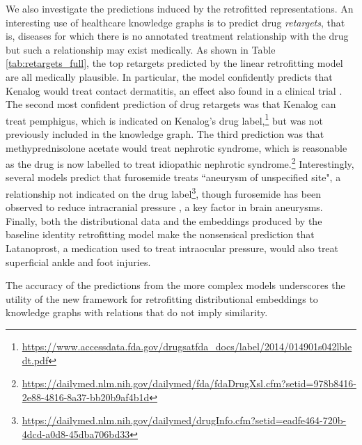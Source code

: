 \documentclass[11pt, a4paper]{article}
\begin{document}
We also investigate the predictions induced by the retrofitted representations. An interesting use of healthcare knowledge graphs is to predict drug \textit{retargets}, that is, diseases for which there is no annotated treatment relationship with the drug but such a relationship may exist medically. As shown in Table \ref{tab:retargets_full}, the top retargets predicted by the linear retrofitting model are all medically plausible. In particular, the model confidently predicts that Kenalog would treat contact dermatitis, an effect also found in a clinical trial \cite{usatine2010diagnosis}.%
The second most confident prediction of drug retargets was that Kenalog can treat pemphigus, which is indicated on Kenalog's drug label,\footnote{\url{https://www.accessdata.fda.gov/drugsatfda_docs/label/2014/014901s042lbledt.pdf}} 
but was not previously included in the knowledge graph.
The third prediction was that methyprednisolone acetate would treat nephrotic syndrome, which is reasonable as the drug is now labelled to treat idiopathic nephrotic syndrome.\footnote{\url{https://dailymed.nlm.nih.gov/dailymed/fda/fdaDrugXsl.cfm?setid=978b8416-2e88-4816-8a37-bb20b9af4b1d}}
Interestingly, several models predict that furosemide treats ``aneurysm of unspecified site", a relationship not indicated on the drug label\footnote{\url{https://dailymed.nlm.nih.gov/dailymed/drugInfo.cfm?setid=eadfe464-720b-4dcd-a0d8-45dba706bd33}}, though furosemide has been observed to reduce intracranial pressure \cite{samson1982furosemide}, a key factor in brain aneurysms.
Finally, both the distributional data and the embeddings produced by the baseline identity retrofitting model make the nonsensical prediction that Latanoprost, a medication used to treat intraocular pressure, would also treat superficial ankle and foot injuries.

The accuracy of the predictions from the more complex models underscores the utility of the new framework for retrofitting distributional embeddings to knowledge graphs with relations that do not imply similarity.
\end{document}
